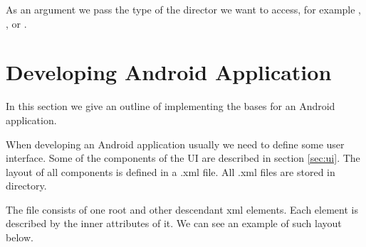 As an argument we pass the type of the director we want to access, for example , , or . %


\section{Developing Android Application}

In this section we give an outline of implementing the bases for an Android application.

When developing an Android application usually we need to define some user interface.
Some of the components of the UI are described in section \ref{sec:ui}.
The layout of all components is defined in a .xml file.
All .xml files are stored in  directory.

The file consists of one root and other descendant xml elements.
Each element is described by the inner attributes of it.
We can see an example of such layout below.
  

